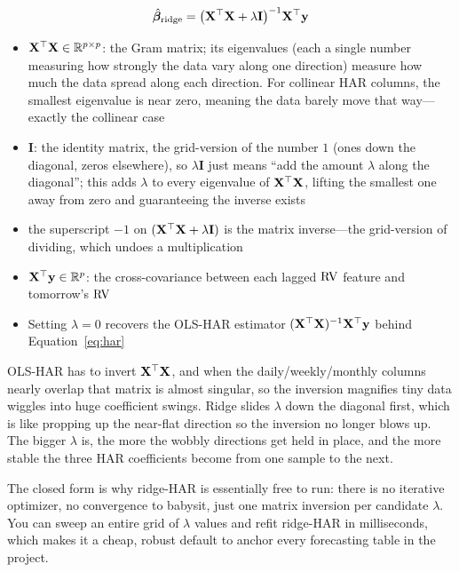 \begin{equation}
  \hat{\bm{\beta}}_{\mathrm{ridge}} = \bigl(\mathbf{X}^\top\mathbf{X} + \lambda\mathbf{I}\bigr)^{-1}\mathbf{X}^\top\mathbf{y}
  \label{eq:ridge-har-closed-form}
\end{equation}
\begin{itemize}[nosep]
  \item $\mathbf{X}^\top\mathbf{X} \in \mathbb{R}^{p\times p}$: the Gram matrix; its eigenvalues (each a single number measuring how strongly the data vary along one direction) measure how much the data spread along each direction. For collinear HAR columns, the smallest eigenvalue is near zero, meaning the data barely move that way---exactly the collinear case
  \item $\mathbf{I}$: the identity matrix, the grid-version of the number $1$ (ones down the diagonal, zeros elsewhere), so $\lambda\mathbf{I}$ just means ``add the amount $\lambda$ along the diagonal''; this adds $\lambda$ to every eigenvalue of $\mathbf{X}^\top\mathbf{X}$, lifting the smallest one away from zero and guaranteeing the inverse exists
  \item the superscript $-1$ on $(\mathbf{X}^\top\mathbf{X} + \lambda\mathbf{I})$ is the matrix inverse---the grid-version of dividing, which undoes a multiplication
  \item $\mathbf{X}^\top\mathbf{y} \in \mathbb{R}^p$: the cross-covariance between each lagged $\operatorname{RV}$ feature and tomorrow's $\operatorname{RV}$
  \item Setting $\lambda = 0$ recovers the OLS-HAR estimator $(\mathbf{X}^\top\mathbf{X})^{-1}\mathbf{X}^\top\mathbf{y}$ behind Equation~\eqref{eq:har}
\end{itemize}

\begin{intuition}
OLS-HAR has to invert $\mathbf{X}^\top\mathbf{X}$, and when the daily/weekly/monthly columns nearly overlap that matrix is almost singular, so the inversion magnifies tiny data wiggles into huge coefficient swings.
Ridge slides $\lambda$ down the diagonal first, which is like propping up the near-flat direction so the inversion no longer blows up.
The bigger $\lambda$ is, the more the wobbly directions get held in place, and the more stable the three HAR coefficients become from one sample to the next.
\end{intuition}

\begin{projectconnection}
The closed form is why ridge-HAR is essentially free to run: there is no iterative optimizer, no convergence to babysit, just one matrix inversion per candidate $\lambda$.
You can sweep an entire grid of $\lambda$ values and refit ridge-HAR in milliseconds, which makes it a cheap, robust default to anchor every forecasting table in the project.
\end{projectconnection}

